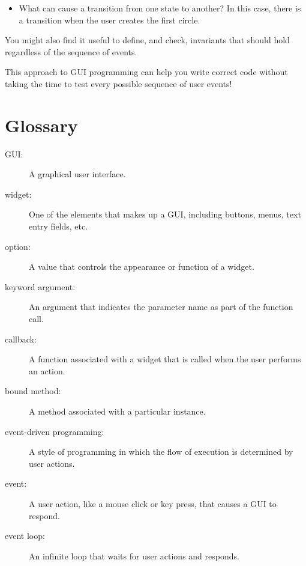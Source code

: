 \documentclass[10pt]{book}
\begin{document}
\begin{CJK}{UTF8}{gbsn}
\begin{itemize}
\item What can cause a transition from one state to another?
In this case, there is a transition when the user creates
the first circle.

\end{itemize}

You might also find it useful to define, and check, invariants that
should hold regardless of the sequence of events.

This approach to GUI programming can help you write correct
code without taking the time to test every possible sequence
of user events!


\section{Glossary}

\begin{description}

\item[GUI:] A graphical user interface.

\item[widget:] One of the elements that makes up a GUI, including
buttons, menus, text entry fields, etc. 

\item[option:] A value that controls the appearance or function of
a widget.

\item[keyword argument:] An argument that indicates the parameter
name as part of the function call.

\item[callback:] A function associated with a widget that is
called when the user performs an action.

\item[bound method:] A method associated with a particular instance.

\item[event-driven programming:] A style of programming in which
the flow of execution is determined by user actions.

\item[event:] A user action, like a mouse click or key press, that
causes a GUI to respond.

\item[event loop:] An infinite loop that waits for user actions
and responds.


\end{description}
\end{CJK}
\end{document}
